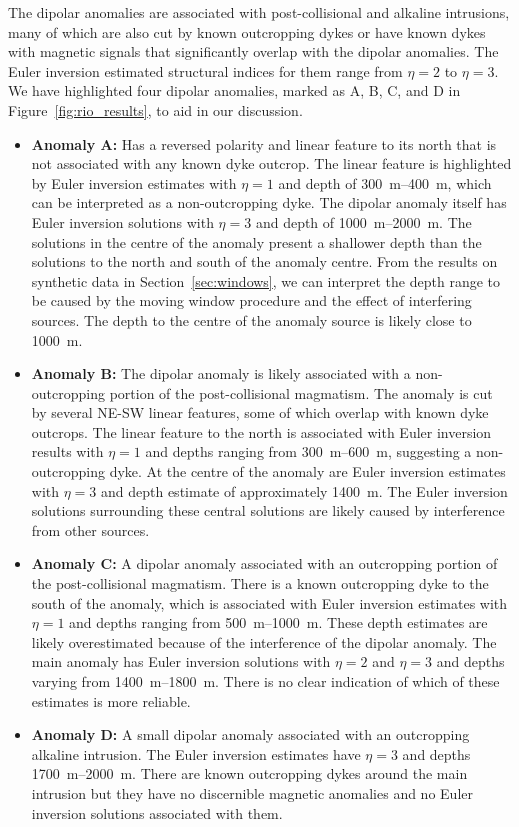 The dipolar anomalies are associated with post-collisional and alkaline intrusions, many of which are also cut by known outcropping dykes or have known dykes with magnetic signals that significantly overlap with the dipolar anomalies.
The Euler inversion estimated structural indices for them range from $\eta=2$ to $\eta=3$.
We have highlighted four dipolar anomalies, marked as A, B, C, and D in Figure~\ref{fig:rio_results}, to aid in our discussion.

\begin{itemize}
\item \textbf{Anomaly A:} Has a reversed polarity and linear feature to its north that is not associated with any known dyke outcrop.
The linear feature is highlighted by Euler inversion estimates with $\eta=1$ and depth of \qtyrange{300}{400}{\m}, which can be interpreted as a non-outcropping dyke.
The dipolar anomaly itself has Euler inversion solutions with $\eta=3$ and depth of \qtyrange{1000}{2000}{\m}.
The solutions in the centre of the anomaly present a shallower depth than the solutions to the north and south of the anomaly centre.
From the results on synthetic data in Section~\ref{sec:windows}, we can interpret the depth range to be caused by the moving window procedure and the effect of interfering sources.
The depth to the centre of the anomaly source is likely close to \qty{1000}{\m}.

\item \textbf{Anomaly B:} The dipolar anomaly is likely associated with a non-outcropping portion of the post-collisional magmatism.
The anomaly is cut by several NE-SW linear features, some of which overlap with known dyke outcrops.
The linear feature to the north is associated with Euler inversion results with $\eta=1$ and depths ranging from \qtyrange{300}{600}{\m}, suggesting a non-outcropping dyke.
At the centre of the anomaly are Euler inversion estimates with $\eta=3$ and depth estimate of approximately \qty{1400}{\m}.
The Euler inversion solutions surrounding these central solutions are likely caused by interference from other sources.

\item \textbf{Anomaly C:} A dipolar anomaly associated with an outcropping portion of the post-collisional magmatism.
There is a known outcropping dyke to the south of the anomaly, which is associated with Euler inversion estimates with $\eta=1$ and depths ranging from \qtyrange{500}{1000}{\m}.
These depth estimates are likely overestimated because of the interference of the dipolar anomaly.
The main anomaly has Euler inversion solutions with $\eta=2$ and $\eta=3$ and depths varying from
\qtyrange{1400}{1800}{\m}.
There is no clear indication of which of these estimates is more reliable.

\item \textbf{Anomaly D:} A small dipolar anomaly associated with an outcropping alkaline intrusion.
The Euler inversion estimates have $\eta=3$ and depths \qtyrange{1700}{2000}{\m}.
There are known outcropping dykes around the main intrusion but they have no discernible magnetic anomalies and no Euler inversion solutions associated with them.
\end{itemize}

